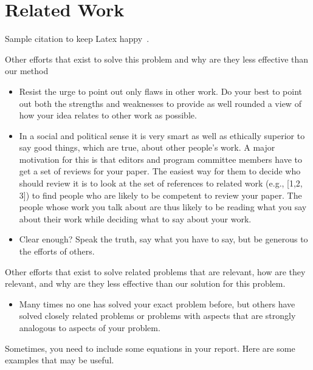 
\section{Related Work}

Sample citation to keep Latex happy~\cite{HennessyPatterson:CompArch5thEd:2011}.

Other efforts that exist to solve this problem and why are they less effective than our method
\begin{itemize}
    \item Resist the urge to point out only flaws in other work. Do your best to point out both the strengths and weaknesses to provide as well rounded a view of how your idea relates to other work as possible.
    \item In a social and political sense it is very smart as well as ethically superior to say good things, which are true, about other people’s work. A major motivation for this is that editors and program committee members have to get a set of reviews for your paper. The easiest way for them to decide who should review it is to look at the set of references to related work (e.g., [1,2, 3]) to find people who are likely to be competent to review your paper. The people whose work you talk about are thus likely to be reading what you say about their work while deciding what to say about your work.
    \item  Clear enough? Speak the truth, say what you have to say, but be generous to the efforts of others.
\end{itemize}

Other efforts that exist to solve related problems that are relevant, how are they relevant, and why are they less effective than our solution for this problem.

\begin{itemize}
    \item  Many times no one has solved your exact problem before, but others have solved closely related problems or problems with aspects that are strongly analogous to aspects of your problem.
\end{itemize}

Sometimes, you need to include some equations in your report. Here are some examples that may be useful.

